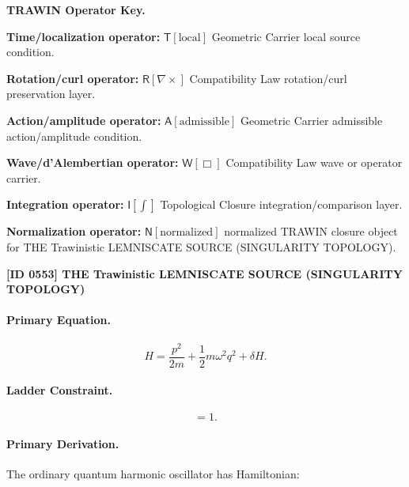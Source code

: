 \par\vspace{0.45\baselineskip}
\noindent\begin{minipage}[t]{\linewidth}
\begingroup
\small
\raggedright
\textbf{TRAWIN Operator Key.}\par
\noindent\textbf{Time/localization operator:} $\mathsf{T}\!\left[\mathrm{local}\right]$ Geometric Carrier local source condition.\par
\noindent\textbf{Rotation/curl operator:} $\mathsf{R}\!\left[\nabla\times\right]$ Compatibility Law rotation/curl preservation layer.\par
\noindent\textbf{Action/amplitude operator:} $\mathsf{A}\!\left[\mathrm{admissible}\right]$ Geometric Carrier admissible action/amplitude condition.\par
\noindent\textbf{Wave/d'Alembertian operator:} $\mathsf{W}\!\left[\Box\right]$ Compatibility Law wave or operator carrier.\par
\noindent\textbf{Integration operator:} $\mathsf{I}\!\left[\int\right]$ Topological Closure integration/comparison layer.\par
\noindent\textbf{Normalization operator:} $\mathsf{N}\!\left[\mathrm{normalized}\right]$ normalized TRAWIN closure object for THE Trawinistic LEMNISCATE SOURCE (SINGULARITY TOPOLOGY).\par
\endgroup
\end{minipage}

\clearpage
\noindent\textbf{[ID 0553] THE Trawinistic LEMNISCATE SOURCE (SINGULARITY TOPOLOGY)}\par
\vspace{0.35em}
\paragraph{Primary Equation.}
\begin{equation}
H
=
\frac{p^2}{2m}
+
\frac{1}{2}m\omega^2 q^2
+
\delta H .
\end{equation}

\paragraph{Ladder Constraint.}
\begin{equation}
[a,a^\dagger]=1 .
\end{equation}

\paragraph{Primary Derivation.}
The ordinary quantum harmonic oscillator has Hamiltonian:

